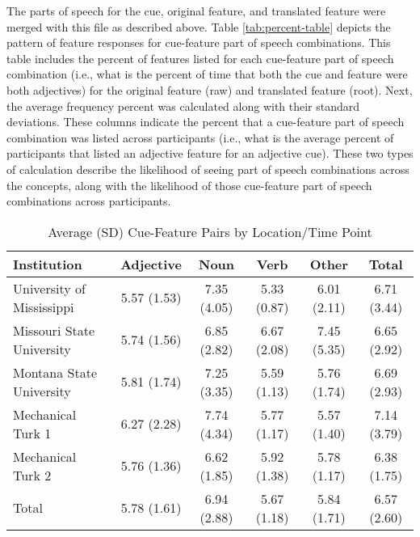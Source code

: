 \documentclass[english,,man]{apa6}
\theoremstyle{definition}
\theoremstyle{definition}
\theoremstyle{definition}
\theoremstyle{remark}
\begin{document}
The parts of speech for the cue, original feature, and translated
feature were merged with this file as described above. Table
\ref{tab:percent-table} depicts the pattern of feature responses for
cue-feature part of speech combinations. This table includes the percent
of features listed for each cue-feature part of speech combination
(i.e., what is the percent of time that both the cue and feature were
both adjectives) for the original feature (raw) and translated feature
(root). Next, the average frequency percent was calculated along with
their standard deviations. These columns indicate the percent that a
cue-feature part of speech combination was listed across participants
(i.e., what is the average percent of participants that listed an
adjective feature for an adjective cue). These two types of calculation
describe the likelihood of seeing part of speech combinations across the
concepts, along with the likelihood of those cue-feature part of speech
combinations across participants.

\begin{table}[tbp]
\begin{center}
\begin{threeparttable}
\caption{\label{tab:feature-table}Average (SD) Cue-Feature Pairs by Location/Time Point}
\begin{tabular}{lccccc}
\toprule
Institution & Adjective & Noun & Verb & Other & Total\\
\midrule
University of Mississippi & 5.57 (1.53) & 7.35 (4.05) & 5.33 (0.87) & 6.01 (2.11) & 6.71 (3.44)\\
Missouri State University & 5.74 (1.56) & 6.85 (2.82) & 6.67 (2.08) & 7.45 (5.35) & 6.65 (2.92)\\
Montana State University & 5.81 (1.74) & 7.25 (3.35) & 5.59 (1.13) & 5.76 (1.74) & 6.69 (2.93)\\
Mechanical Turk 1 & 6.27 (2.28) & 7.74 (4.34) & 5.77 (1.17) & 5.57 (1.40) & 7.14 (3.79)\\
Mechanical Turk 2 & 5.76 (1.36) & 6.62 (1.85) & 5.92 (1.38) & 5.78 (1.17) & 6.38 (1.75)\\
Total & 5.78 (1.61) & 6.94 (2.88) & 5.67 (1.18) & 5.84 (1.71) & 6.57 (2.60)\\
\bottomrule
\end{tabular}
\end{threeparttable}
\end{center}
\end{table}
\end{document}

